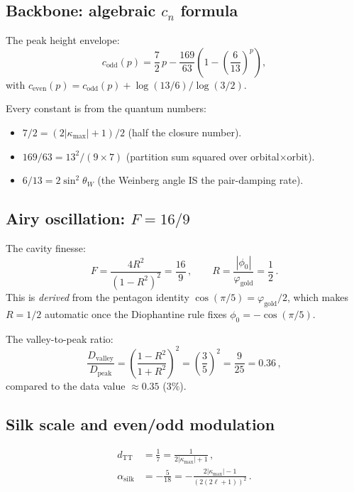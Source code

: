 \documentclass[11pt,letterpaper]{article}
\numberwithin{equation}{section}
\begin{document}
\subsection{Backbone: algebraic $c_n$ formula}

The peak height envelope:
\begin{equation}\label{eq:cn}
  c_\mathrm{odd}(p) = \frac{7}{2}\,p
  - \frac{169}{63}\left(1 - \left(\frac{6}{13}\right)^p\right),
\end{equation}
with $c_\mathrm{even}(p) = c_\mathrm{odd}(p) + \log(13/6)/\log(3/2)$.

Every constant is from the quantum numbers:
\begin{itemize}
  \item $7/2 = (2|\kappa_\mathrm{max}|+1)/2$ (half the closure number).
  \item $169/63 = 13^2/(9 \times 7)$ (partition sum squared over
    orbital$\times$orbit).
  \item $6/13 = 2\sin^2\!\theta_W$ (the Weinberg angle IS the
    pair-damping rate).
\end{itemize}

\subsection{Airy oscillation: $F = 16/9$}

The cavity finesse:
\begin{equation}
  F = \frac{4R^2}{(1 - R^2)^2} = \frac{16}{9}\,,
  \qquad R = \frac{|\phi_0|}{\varphi_\mathrm{gold}} = \frac{1}{2}\,.
\end{equation}
This is \emph{derived} from the pentagon identity
$\cos(\pi/5) = \varphi_\mathrm{gold}/2$, which makes $R = 1/2$
automatic once the Diophantine rule fixes $\phi_0 = -\cos(\pi/5)$.

The valley-to-peak ratio:
\begin{equation}
  \frac{D_\mathrm{valley}}{D_\mathrm{peak}}
  = \left(\frac{1-R^2}{1+R^2}\right)^2
  = \left(\frac{3}{5}\right)^2 = \frac{9}{25} = 0.36\,,
\end{equation}
compared to the data value $\approx 0.35$ ($3\%$).

\subsection{Silk scale and even/odd modulation}

\begin{align}
  d_\mathrm{TT} &= \frac{1}{7} = \frac{1}{2|\kappa_\mathrm{max}|+1}\,,\\
  \alpha_\mathrm{silk} &= -\frac{5}{18}
  = -\frac{2|\kappa_\mathrm{max}|-1}{(2(2\ell+1))^2}\,.
\end{align}
\end{document}
